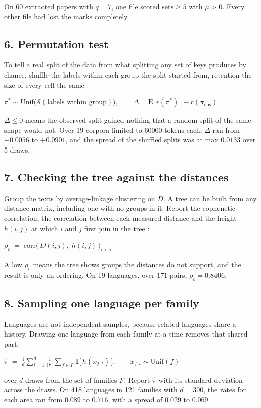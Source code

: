 On 60 extracted papers with \(q=7\), one file scored \(\mathrm{sets} \ge 5\) with \(\mu > 0\). Every other file had lost the marks completely.

\subsection{6. Permutation test}

To tell a real split of the data from what splitting any set of keys produces by chance, shuffle the labels within each group the split started from, retention the size of every cell the same \cite{src:Good-2005}:

\(\pi^{\ast} \sim \mathrm{Unif}\bigl(\mathcal{S}(\text{labels within group})\bigr), \qquad \Delta = \mathrm{E}\bigl[\,r(\pi^{\ast})\,\bigr] - r(\pi_{\text{obs}})\)

\(\Delta \le 0\) means the observed split gained nothing that a random split of the same shape would not. Over 19 corpora limited to 60000 tokens each, \(\Delta\) ran from \(+0.0056\) to \(+0.0901\), and the spread of the shuffled splits was at max \(0.0133\) over 5 draws.

\subsection{7. Checking the tree against the distances}

Group the texts by average-linkage clustering on \(D\). A tree can be built from any distance matrix, including one with no groups in it. Report the cophenetic correlation, the correlation between each measured distance and the height \(h(i,j)\) at which \(i\) and \(j\) first join in the tree \cite{src:Sokal-and-Rohlf-1962}:

\(\rho_c \;=\; \mathrm{corr}\bigl(\,D(i,j),\; h(i,j)\,\bigr)_{i < j}\)

A low \(\rho_c\) means the tree shows groups the distances do not support, and the result is only an ordering. On 19 languages, over \(171\) pairs, \(\rho_c = 0.8406\).

\subsection{8. Sampling one language per family}

Languages are not independent samples, because related languages share a history. Drawing one language from each family at a time removes that shared part:

\(\hat{\pi} \;=\; \frac{1}{d}\sum_{t=1}^{d} \frac{1}{|F|}\sum_{f \in F} \mathbf{1}\bigl[\,h(x_{f,t})\,\bigr], \qquad x_{f,t} \sim \mathrm{Unif}(f)\)

over \(d\) draws from the set of families \(F\). Report \(\hat{\pi}\) with its standard deviation across the draws. On 418 languages in 121 families with \(d=300\), the rates for each area ran from \(0.089\) to \(0.716\), with a spread of \(0.029\) to \(0.069\).

